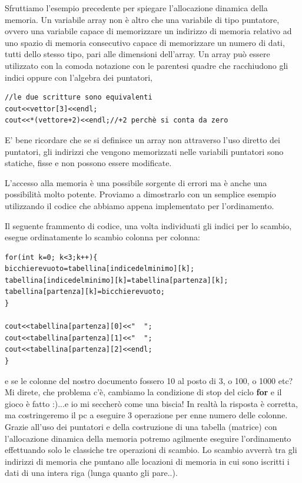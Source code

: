 \documentclass[11pt,fleqn]{book} %
\begin{document}
Sfruttiamo l'esempio precedente per spiegare l'allocazione dinamica della memoria. Un variabile array non è altro che una variabile di tipo puntatore, ovvero una variabile capace di memorizzare un indirizzo di memoria relativo ad uno spazio di memoria consecutivo capace di memorizzare un numero di dati, tutti dello stesso tipo, pari alle dimensioni dell'array.
Un array può essere utilizzato con la comoda notazione con le parentesi quadre che racchiudono gli indici oppure con l'algebra dei puntatori, 
\begin{verbatim}
//le due scritture sono equivalenti
cout<<vettor[3]<<endl;
cout<<*(vettore+2)<<endl;//+2 perchè si conta da zero
\end{verbatim}


E' bene ricordare che se si definisce un array non attraverso l'uso diretto dei puntatori, gli indirizzi che vengono memorizzati nelle variabili puntatori sono statiche, fisse e non possono essere modificate.

L'accesso alla memoria è una possibile sorgente di errori ma è anche una possibilità molto potente. Proviamo a dimostrarlo con un semplice esempio utilizzando il codice che abbiamo appena implementato per l'ordinamento.

Il seguente frammento di codice, una volta individuati gli indici per lo scambio, esegue ordinatamente lo scambio colonna per colonna:

\begin{verbatim}
for(int k=0; k<3;k++){
bicchierevuoto=tabellina[indicedelminimo][k];
tabellina[indicedelminimo][k]=tabellina[partenza][k];
tabellina[partenza][k]=bicchierevuoto;
}

cout<<tabellina[partenza][0]<<"  ";
cout<<tabellina[partenza][1]<<"  ";
cout<<tabellina[partenza][2]<<endl;
}
\end{verbatim}

e se le colonne del nostro documento fossero 10 al posto di 3, o 100, o 1000 etc? Mi direte, che problema c'è, cambiamo la condizione di stop del ciclo \textbf{for} e il gioco è fatto :)...e io mi seccherò come una biscia! In realtà la risposta è corretta, ma costringeremo il pc a eseguire 3 operazione per enne numero delle colonne. Grazie all'uso dei puntatori e della costruzione di una tabella (matrice) con l'allocazione dinamica della memoria potremo agilmente eseguire l'ordinamento effettuando solo le classiche tre operazioni di scambio. Lo scambio avverrà tra gli indirizzi di memoria che puntano alle locazioni di memoria in cui sono iscritti i dati di una intera riga (lunga quanto gli pare..).
\end{document}
